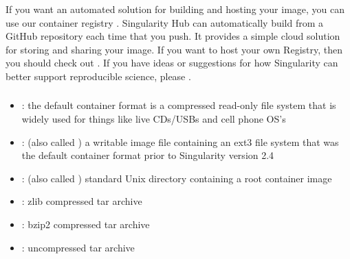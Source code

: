 \documentclass[letterpaper,10pt,english]{sphinxmanual}
\begin{document}
If you want an automated solution for building and hosting your image,
you can use our container registry . Singularity Hub
can automatically build  from
a GitHub repository each time that you push. It provides a simple cloud
solution for storing and sharing your image. If you want to host your own
Registry, then you should check out .
If you have ideas or suggestions for how Singularity can better support
reproducible science, please .


\subsubsection{}
\label{\detokenize{introduction:supported-container-formats}}\begin{itemize}
\item {} 
: the default container format is a compressed read-only
file system that is widely used for things like live CDs/USBs and
cell phone OS’s

\item {} 
: (also called ) a writable image file containing an ext3
file system that was the default container format prior to
Singularity version 2.4

\item {} 
: (also called ) standard Unix directory containing a
root container image

\item {} 
: zlib compressed tar archive

\item {} 
: bzip2 compressed tar archive

\item {} 
: uncompressed tar archive

\end{itemize}
\end{document}
